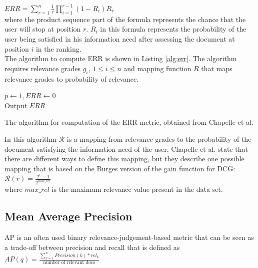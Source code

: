 $ERR = \sum\nolimits_{r=1}^n \frac{1}{r} \prod\nolimits_{i=1}^{r-1}(1-R_i)R_r$\\

where the product sequence part of the formula represents the chance that the user will stop at position $r$. $R_i$ in this formula represents the probability of the user being satisfied in his information need after assessing the document at position $i$ in the ranking.\\

The algorithm to compute \ac{ERR} is shown in Listing \ref{alg:err}. The algorithm requires relevance grades $g_i$, $1 \le i \le n$ and mapping function $R$ that maps relevance grades to probability of relevance.\\

\LinesNumbered
\begin{algorithm}[H]
 $p \leftarrow 1, ERR \leftarrow 0$\\
 Output $ERR$
 \caption{The algorithm for computation of the \acs{ERR} metric, obtained from Chapelle et al. \cite{Chapelle2009}}
 \label{alg:err}
\end{algorithm}
\vspace{0.5cm}
In this algorithm $\mathcal{R}$ is a mapping from relevance grades to the probability of the document satisfying the information need of the user. Chapelle et al. \cite{Chapelle2009} state that there are different ways to define this mapping, but they describe one possible mapping that is based on the Burges version \cite{Burges2005} of the gain function for \ac{DCG}:\\

$\mathcal{R}(r) = \frac{2^{r}-1}{2^{max\_rel}}$\\

\noindent where $max\_rel$ is the maximum relevance value present in the data set.

\subsection{Mean Average Precision}
\ac{AP} \cite{Zhu2004} is an often used binary relevance-judgement-based metric that can be seen as a trade-off between precision and recall that is defined as\\

$AP(q) = \frac{\sum\nolimits_{k=1}^{n}Precision(k)*rel_k}{\text{number of relevant docs}}$\\

